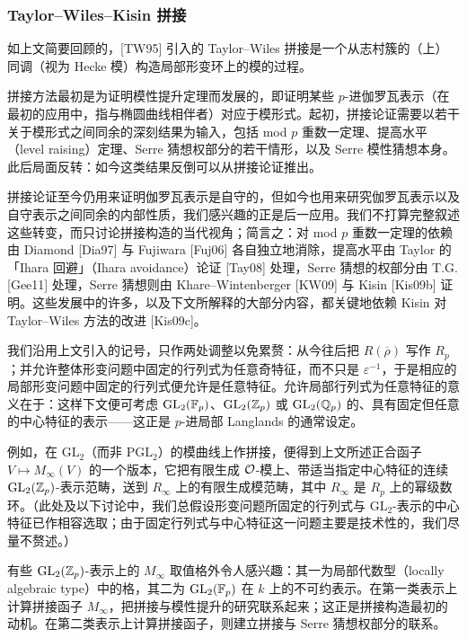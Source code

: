 \subsubsection{Taylor--Wiles--Kisin 拼接}

如上文简要回顾的，[TW95] 引入的 Taylor--Wiles 拼接是一个从志村簇的（上）同调（视为 Hecke 模）构造局部形变环上的模的过程。

拼接方法最初是为证明模性提升定理而发展的，即证明某些 $p$-进伽罗瓦表示（在最初的应用中，指与椭圆曲线相伴者）对应于模形式。起初，拼接论证需要以若干关于模形式之间同余的深刻结果为输入，包括 mod $p$ 重数一定理、提高水平（level raising）定理、Serre 猜想权部分的若干情形，以及 Serre 模性猜想本身。此后局面反转：如今这类结果反倒可以从拼接论证推出。

拼接论证至今仍用来证明伽罗瓦表示是自守的，但如今也用来研究伽罗瓦表示以及自守表示之间同余的内部性质，我们感兴趣的正是后一应用。我们不打算完整叙述这些转变，而只讨论拼接构造的当代视角；简言之：对 mod $p$ 重数一定理的依赖由 Diamond [Dia97] 与 Fujiwara [Fuj06] 各自独立地消除，提高水平由 Taylor 的「Ihara 回避」（Ihara avoidance）论证 [Tay08] 处理，Serre 猜想的权部分由 T.G. [Gee11] 处理，Serre 猜想则由 Khare--Wintenberger [KW09] 与 Kisin [Kis09b] 证明。这些发展中的许多，以及下文所解释的大部分内容，都关键地依赖 Kisin 对 Taylor--Wiles 方法的改进 [Kis09c]。

我们沿用上文引入的记号，只作两处调整以免累赘：从今往后把 $R(\overline{\rho})$ 写作 $R_p$；并允许整体形变问题中固定的行列式为任意奇特征，而不只是 $\varepsilon^{-1}$，于是相应的局部形变问题中固定的行列式便允许是任意特征。允许局部行列式为任意特征的意义在于：这样下文便可考虑 $\mathrm{GL}_2(\mathbb{F}_p)$、$\mathrm{GL}_2(\mathbb{Z}_p)$ 或 $\mathrm{GL}_2(\mathbb{Q}_p)$ 的、具有固定但任意的中心特征的表示——这正是 $p$-进局部 Langlands 的通常设定。

例如，在 $\mathrm{GL}_2$（而非 $\mathrm{PGL}_2$）的模曲线上作拼接，便得到上文所述正合函子 $V\mapsto M_\infty(V)$ 的一个版本，它把有限生成 $\mathcal{O}$-模上、带适当指定中心特征的连续 $\mathrm{GL}_2(\mathbb{Z}_p)$-表示范畴，送到 $R_\infty$ 上的有限生成模范畴，其中 $R_\infty$ 是 $R_p$ 上的幂级数环。（此处及以下讨论中，我们总假设形变问题所固定的行列式与 $\mathrm{GL}_2$-表示的中心特征已作相容选取；由于固定行列式与中心特征这一问题主要是技术性的，我们尽量不赘述。）

有些 $\mathrm{GL}_2(\mathbb{Z}_p)$-表示上的 $M_\infty$ 取值格外令人感兴趣：其一为局部代数型（locally algebraic type）中的格，其二为 $\mathrm{GL}_2(\mathbb{F}_p)$ 在 $k$ 上的不可约表示。在第一类表示上计算拼接函子 $M_\infty$，把拼接与模性提升的研究联系起来；这正是拼接构造最初的动机。在第二类表示上计算拼接函子，则建立拼接与 Serre 猜想权部分的联系。

